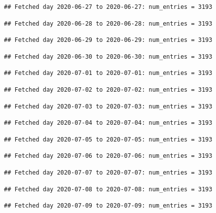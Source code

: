 \documentclass[]{article}
\begin{document}
\begin{verbatim}
## Fetched day 2020-06-27 to 2020-06-27: num_entries = 3193
\end{verbatim}

\begin{verbatim}
## Fetched day 2020-06-28 to 2020-06-28: num_entries = 3193
\end{verbatim}

\begin{verbatim}
## Fetched day 2020-06-29 to 2020-06-29: num_entries = 3193
\end{verbatim}

\begin{verbatim}
## Fetched day 2020-06-30 to 2020-06-30: num_entries = 3193
\end{verbatim}

\begin{verbatim}
## Fetched day 2020-07-01 to 2020-07-01: num_entries = 3193
\end{verbatim}

\begin{verbatim}
## Fetched day 2020-07-02 to 2020-07-02: num_entries = 3193
\end{verbatim}

\begin{verbatim}
## Fetched day 2020-07-03 to 2020-07-03: num_entries = 3193
\end{verbatim}

\begin{verbatim}
## Fetched day 2020-07-04 to 2020-07-04: num_entries = 3193
\end{verbatim}

\begin{verbatim}
## Fetched day 2020-07-05 to 2020-07-05: num_entries = 3193
\end{verbatim}

\begin{verbatim}
## Fetched day 2020-07-06 to 2020-07-06: num_entries = 3193
\end{verbatim}

\begin{verbatim}
## Fetched day 2020-07-07 to 2020-07-07: num_entries = 3193
\end{verbatim}

\begin{verbatim}
## Fetched day 2020-07-08 to 2020-07-08: num_entries = 3193
\end{verbatim}

\begin{verbatim}
## Fetched day 2020-07-09 to 2020-07-09: num_entries = 3193
\end{verbatim}
\end{document}
